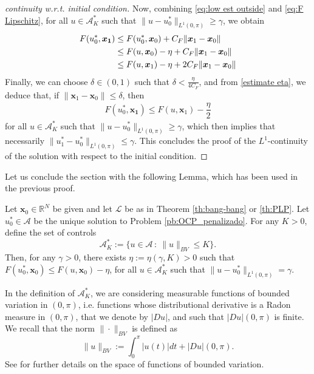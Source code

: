 \documentclass[twocolumn]{autart}    %
\begin{document}
\begin{proof}[continuity w.r.t. initial condition]
	Now,  combining  \eqref{eq:low est outside} and \eqref{eq:F Lipschitz}, for all $u\in \mathcal{A}_K^\ast$ such that $\| u-u_0^\ast\|_{L^1(0,\pi)} \geq \gamma$, we obtain
	\begin{align}\label{estimate eta}
		F(u_0^\ast, \bm{x_1}) & \leq F(u_0^\ast,  \bm{x}_0) +  C_F \| \bm{x}_1- \bm{x}_0\| \notag 
		\\
		& \leq F(u,  \bm{x}_0) - \eta +  C_F \| \bm{x}_1- \bm{x}_0\| 
		\\
		& \leq F(u,  \bm{x}_1) - \eta  + 2 C_F \| \bm{x}_1- \bm{x}_0\| \notag  
	\end{align}
	Finally, we can choose $\delta \in (0,1)$ such that $\delta <\frac{\eta}{4C_F}$,  and from \eqref{estimate eta}, we deduce that, if $\|\bm{x}_1 - \bm{x}_0\| \leq \delta$, then
	\begin{align*} 
		F(u_0^\ast, \bm{x_1})  \leq F(u,  \bm{x}_1)  - \dfrac{\eta}{2}
	\end{align*} 
	for all $u\in \mathcal{A}_K^\ast$ such that  $\| u-u_0^\ast\|_{L^1(0,\pi)} \geq \gamma$, which then implies that necessarily $\| u_1^\ast-u_0^\ast\|_{L^1(0,\pi)} \leq \gamma$. This concludes the proof of the $L^1$-continuity of the solution with respect to the initial condition.
\end{proof}

Let us conclude the section with the following Lemma, which has been used in the previous proof.

\vspace{0.5em}
\begin{lemma}\label{lem: compactness}
Let $\bm{x}_0\in \mathbb{R}^N$ be given and let $\mathcal{L}$ be as in Theorem \ref{th:bang-bang} or \ref{th:PLP}. Let $u^\ast_0\in\mathcal{A}$ be the unique solution to Problem \ref{pb:OCP_penalizado}. For any $K>0$, define the set of controls
\begin{equation}\label{A star K}
	\mathcal{A}_K^\ast := \{ u\in \mathcal{A}\, : \ \| u\|_{BV} \leq K \}.
\end{equation}
Then, for any $\gamma >0$, there exists $\eta:=\eta(\gamma ,K)>0$ such that $F(u^\ast_0, \bm{x}_0 ) \leq F(u, \bm{x}_0 ) - \eta$, for all $u\in \mathcal{A}_K^\ast$ such that $\|u - u_0^\ast\|_{L^1(0,\pi)} = \gamma$.
\end{lemma}

In the definition of $\mathcal{A}_K^\ast$,  we are considering measurable functions of bounded variation in $(0,\pi)$, i.e. functions whose distributional derivative is a Radon measure in $(0,\pi)$, that we denote by $|Du|$, and such that $|Du|(0,\pi)$ is finite.
We recall that the norm $\| \cdot\|_{BV}$ is defined as
\begin{equation}\label{BV norm}
	\| u\|_{BV} := \int_0^\pi |u(t)|dt + |Du| (0,\pi ).
\end{equation}
See \cite[Chapter 3]{ambrosio2000functions} for further details on the space of functions of bounded variation.
\end{document}
